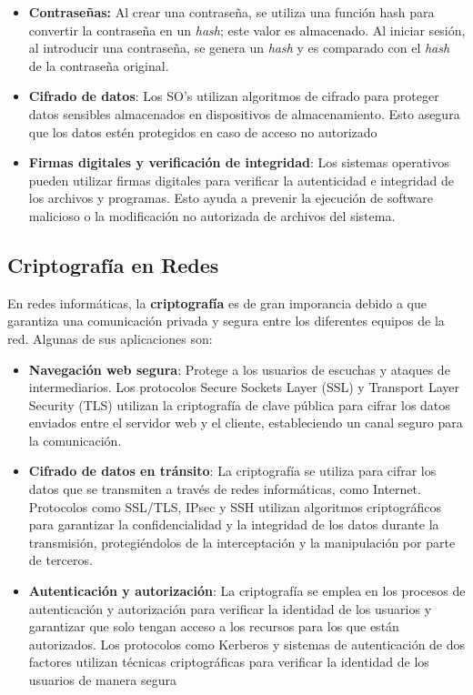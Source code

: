 \documentclass[12pt, a4paper]{article} %
\begin{document}
\begin{itemize}
	\item \textbf{Contraseñas:} Al crear una contraseña, se utiliza una función hash para convertir la contraseña en un \textit{hash}; este valor es almacenado. Al iniciar sesión, al introducir una contraseña, se genera un \textit{hash} y es comparado con el \textit{hash} de la contraseña original.

	\item \textbf{Cifrado de datos}: Los SO's utilizan algoritmos de cifrado para proteger datos sensibles almacenados en dispositivos de almacenamiento. Esto asegura que los datos estén protegidos en caso de acceso no autorizado

	\item \textbf{Firmas digitales y verificación de integridad}: Los sistemas operativos pueden utilizar firmas digitales para verificar la autenticidad e integridad de los archivos y programas. Esto ayuda a prevenir la ejecución de software malicioso o la modificación no autorizada de archivos del sistema.
\end{itemize}

\subsection{Criptografía en Redes}

En redes informáticas, la \textbf{criptografía} es de gran imporancia debido a que garantiza una comunicación privada y segura entre los diferentes equipos de la red. Algunas de sus aplicaciones son:

\begin{itemize}
	\item \textbf{Navegación web segura}: Protege a los usuarios de escuchas y ataques de intermediarios. Los protocolos Secure Sockets Layer (SSL) y Transport Layer Security (TLS) utilizan la criptografía de clave pública para cifrar los datos enviados entre el servidor web y el cliente, estableciendo un canal seguro para la comunicación.

	\item \textbf{Cifrado de datos en tránsito}: La criptografía se utiliza para cifrar los datos que se transmiten a través de redes informáticas, como Internet. Protocolos como SSL/TLS, IPsec y SSH utilizan algoritmos criptográficos para garantizar la confidencialidad y la integridad de los datos durante la transmisión, protegiéndolos de la interceptación y la manipulación por parte de terceros.

	\item \textbf{Autenticación y autorización}: La criptografía se emplea en los procesos de autenticación y autorización para verificar la identidad de los usuarios y garantizar que solo tengan acceso a los recursos para los que están autorizados. Los protocolos como Kerberos y sistemas de autenticación de dos factores utilizan técnicas criptográficas para verificar la identidad de los usuarios de manera segura
\end{itemize}
\end{document}
